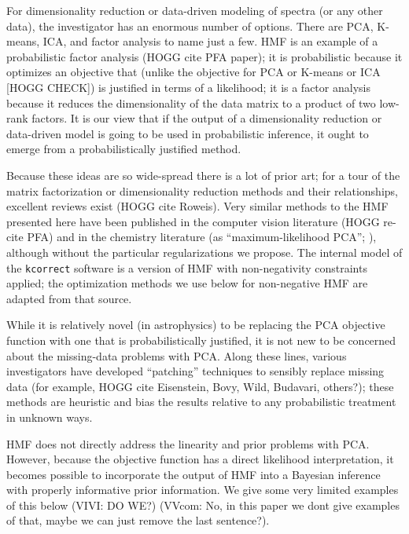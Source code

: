 \documentclass[12pt,preprint]{aastex}
\begin{document}
For dimensionality reduction or data-driven modeling of spectra (or
any other data), the investigator has an enormous number of options.
There are PCA, K-means, ICA, and factor analysis to name just a few.
HMF is an example of a probabilistic factor analysis (HOGG cite PFA
paper); it is probabilistic because it optimizes an objective that
(unlike the objective for PCA or K-means or ICA [HOGG CHECK]) is
justified in terms of a likelihood; it is a factor analysis because it
reduces the dimensionality of the data matrix to a product of two
low-rank factors.  It is our view that if the output of a
dimensionality reduction or data-driven model is going to be used in
probabilistic inference, it ought to emerge from a probabilistically
justified method.

Because these ideas are so wide-spread there is a lot of prior art;
for a tour of the matrix factorization or dimensionality reduction
methods and their relationships, excellent reviews exist (HOGG cite
Roweis).  Very similar methods to the HMF presented here have been
published in the computer vision literature (HOGG re-cite PFA) and in
the chemistry literature (as ``maximum-likelihood PCA'';
\citealt{mlpca}), although without the particular regularizations we
propose.  The internal model of the \texttt{kcorrect} software
\citep{blanton} is a version of HMF with non-negativity constraints
applied; the optimization methods we use below for non-negative HMF
are adapted from that source.

While it is relatively novel (in astrophysics) to be replacing the PCA
objective function with one that is probabilistically justified, it is
not new to be concerned about the missing-data problems with PCA.
Along these lines, various investigators have developed ``patching''
techniques to sensibly replace missing data (for example, HOGG cite
Eisenstein, Bovy, Wild, Budavari, others?); these methods are
heuristic and bias the results relative to any probabilistic treatment
in unknown ways.

HMF does not directly address the linearity and prior problems with
PCA.  However, because the objective function has a direct likelihood
interpretation, it becomes possible to incorporate the output of HMF
into a Bayesian inference with properly informative prior information.
We give some very limited examples of this below (VIVI: DO WE?)
(VVcom: No, in this paper we dont give examples of that, maybe we can 
just remove the last sentence?).
\end{document}
